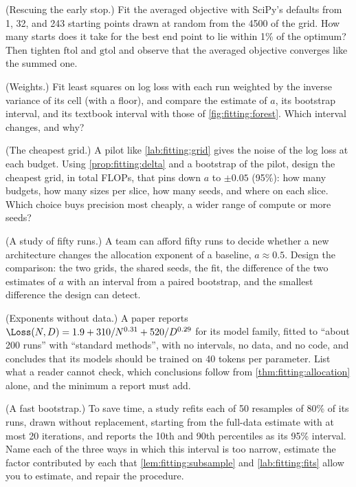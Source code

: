 \begin{refsection}
\begin{exercises}
\item \labwork (Rescuing the early stop.) Fit the averaged objective with SciPy's defaults from 1, 32, and 243 starting points drawn at random from the 4500 of the grid. How many starts does it take for the best end point to lie within 1\% of the optimum? Then tighten $\mathrm{ftol}$ and $\mathrm{gtol}$ and observe that the averaged objective converges like the summed one.\label{ex:fitting:rescue}

\item \labwork (Weights.) Fit least squares on log loss with each run weighted by the inverse variance of its cell (with a floor), and compare the estimate of $a$, its bootstrap interval, and its textbook interval with those of \cref{fig:fitting:forest}. Which interval changes, and why?\label{ex:fitting:weights}

\item \design (The cheapest grid.) A pilot like \cref{lab:fitting:grid} gives the noise of the log loss at each budget. Using \cref{prop:fitting:delta} and a bootstrap of the pilot, design the cheapest grid, in total FLOPs, that pins down $a$ to $\pm0.05$ (95\%): how many budgets, how many sizes per slice, how many seeds, and where on each slice. Which choice buys precision most cheaply, a wider range of compute or more seeds?\label{ex:fitting:design}

\item \design (A study of fifty runs.) A team can afford fifty runs to decide whether a new architecture changes the allocation exponent of a baseline, $a\approx0.5$. Design the comparison: the two grids, the shared seeds, the fit, the difference of the two estimates of $a$ with an interval from a paired bootstrap, and the smallest difference the design can detect.\label{ex:fitting:fifty}

\item \critique (Exponents without data.) A paper reports $\Loss(N,D)=1.9+310/N^{0.31}+520/D^{0.29}$ for its model family, fitted to ``about 200 runs'' with ``standard methods'', with no intervals, no data, and no code, and concludes that its models should be trained on 40 tokens per parameter. List what a reader cannot check, which conclusions follow from \cref{thm:fitting:allocation} alone, and the minimum a report must add.\label{ex:fitting:critique1}

\item \critique (A fast bootstrap.) To save time, a study refits each of 50 resamples of 80\% of its runs, drawn without replacement, starting from the full-data estimate with at most 20 iterations, and reports the 10th and 90th percentiles as its 95\% interval. Name each of the three ways in which this interval is too narrow, estimate the factor contributed by each that \cref{lem:fitting:subsample} and \cref{lab:fitting:fits} allow you to estimate, and repair the procedure.\label{ex:fitting:critique2}


\end{exercises}
\end{refsection}
